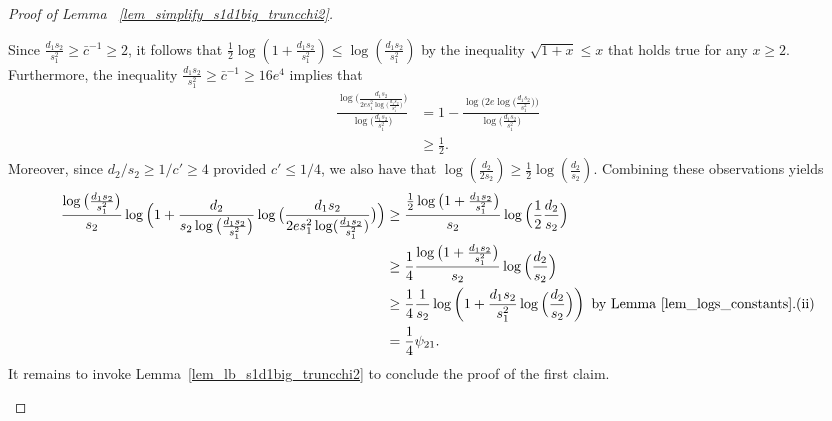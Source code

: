 \documentclass{article}
\theoremstyle{remark}
\begin{document}
\begin{proof}[Proof of Lemma ~\ref{lem_simplify_s1d1big_truncchi2}]
\begin{enumerate}
 Since $\frac{d_1s_2}{s_1^2} \geq \bar{c}^{-1} \geq 2$, it follows that $\frac{1}{2}\log(1 + \frac{d_1s_2}{s_1^2}) \leq \log(\frac{d_1s_2}{s_1^2})$ by the inequality $\sqrt{1+x} \leq x$ that holds true for any $x \geq 2$. Furthermore, the inequality $\frac{d_1s_2}{s_1^2} \geq \bar{c}^{-1} \geq 16e^4$ implies that 
 \begin{align*}
 \frac{\log\Big(\frac{d_1s_2}{2es_1^2\log\big(\frac{d_1s_2}{s_1^2}\big)}\Big)}{\log \big(\frac{d_1s_2}{s_1^2}\big)} &= 1 - \frac{\log\Big(2e\log\big(\frac{d_1s_2}{s_1^2}\big)\Big)}{\log\big(\frac{d_1s_2}{s_1^2}\big)} \\
 &\geq \frac12.
 \end{align*}
Moreover, since $d_2/s_2 \geq 1/c' \geq 4$ provided $c' \leq 1/4$, we also have that $\log\left(\frac{d_2}{2s_2}\right) \geq \frac{1}{2} \log\left(\frac{d_2}{s_2}\right)$. Combining these observations yields 
\begin{align}
    \frac{\log\big(\frac{d_1s_2}{s_1^2}\big)}{s_2}\log\Big(1 +  \frac{d_2}{s_2\log\big(\frac{d_1s_2}{s_1^2}\big)}\log \big(\frac{d_1s_2}{2es_1^2\log(\frac{d_1s_2}{s_1^2})}\big)\Big) &\geq \frac{\frac{1}{2}\log\big(1 + \frac{d_1s_2}{s_1^2}\big)}{s_2}\log\Big(
\frac12\frac{d_2}{s_2}\Big)\nonumber\\
& \geq \frac14\frac{\log\big(1 + \frac{d_1s_2}{s_1^2}\big)}{s_2} \log\Big(
\frac{d_2}{s_2}\Big)\nonumber\\
& \geq \frac{1}{4} \frac{1}{s_2} \log\left(1 + \frac{d_1s_2}{s_1^2}\log\Big(
\frac{d_2}{s_2}\Big)\right) \text{ by Lemma~\ref{lem_logs_constants}.(ii)}\nonumber\\
& = \frac{1}{4} \psi_{21}.\label{eq_psi12/4}
\end{align}
It remains to invoke Lemma~\ref{lem_lb_s1d1big_truncchi2} to conclude the proof of the first claim. 


\end{enumerate}
\end{proof}
\end{document}
